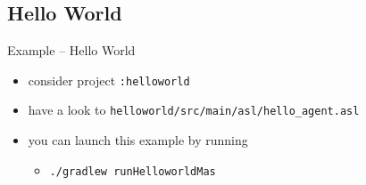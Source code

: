 \documentclass[presentation]{beamer}\mode<presentation>{\usetheme{AMSBolognaFC}}
\begin{document}
\setcounter{JasonExample}{1}

\subsection{Hello World}

\begin{frame}[c]{Example \theJasonExample{} -- Hello World}
    
    
    \begin{itemize}
        \item consider project \texttt{:helloworld}
        
        \vfill
        
        \item have a look to \texttt{helloworld/src/main/asl/\alert{hello\_agent.asl}}
        
        
        \vfill
        
        \item you can launch this example by running
        \begin{itemize}
            \item[\$] \texttt{./gradlew runHelloworldMas}
        \end{itemize}
    \end{itemize}
\end{frame} 
\end{document}
